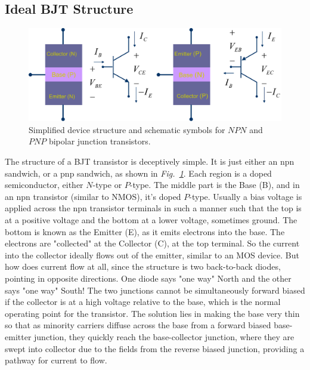 \subsection{Ideal BJT Structure}
\begin{figure}[tb]
\centering
\includegraphics[width=.85\columnwidth]{slide2_bjt_overview}
\caption{Simplified device structure and schematic symbols for $NPN$ and $PNP$ bipolar junction transistors.}
\label{fig:slide2_bjt_overview}
\end{figure}
The structure of a BJT transistor is deceptively simple.  It is just either an npn sandwich, or a pnp sandwich, as shown in \emph{Fig.~\ref{fig:slide2_bjt_overview}}.  Each region is a doped semiconductor, either $N$-type or $P$-type.  The middle part is the Base (B), and in an npn transistor (similar to NMOS), it's doped $P$-type.  Usually a bias voltage is applied across the npn transistor terminals in such a manner such that the top is at a positive voltage and the bottom at a lower voltage, sometimes ground.  The bottom is known as the Emitter (E), as it emits electrons into the base.  The electrons are "collected" at the Collector (C), at the top terminal.  So the current into the collector ideally flows out of the emitter, similar to an MOS device.
But how does current flow at all, since the structure is two back-to-back diodes, pointing in opposite directions.  One diode says "one way" North and the other says "one way" South!  The two junctions cannot be simultaneously forward biased if the collector is at a high voltage relative to the base, which is the normal operating point for the transistor.  The solution lies in making the base very thin so that as minority carriers diffuse across the base from a forward biased base-emitter junction, they quickly reach the base-collector junction, where they are swept into collector due to the fields from the reverse biased junction, providing a pathway for current to flow.  
